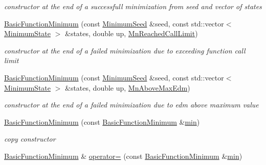 \begin{DoxyCompactItemize}
\begin{DoxyCompactList}\small\item\em constructor at the end of a successfull minimization from seed and vector of states \end{DoxyCompactList}\item 
\mbox{\hyperlink{classROOT_1_1Minuit2_1_1BasicFunctionMinimum_a2a15d2336acfb9f3be41de8e477c191a}{Basic\+Function\+Minimum}} (const \mbox{\hyperlink{classROOT_1_1Minuit2_1_1MinimumSeed}{Minimum\+Seed}} \&seed, const std\+::vector$<$ \mbox{\hyperlink{classROOT_1_1Minuit2_1_1MinimumState}{Minimum\+State}} $>$ \&states, double up, \mbox{\hyperlink{classROOT_1_1Minuit2_1_1BasicFunctionMinimum_1_1MnReachedCallLimit}{Mn\+Reached\+Call\+Limit}})
\begin{DoxyCompactList}\small\item\em constructor at the end of a failed minimization due to exceeding function call limit \end{DoxyCompactList}\item 
\mbox{\hyperlink{classROOT_1_1Minuit2_1_1BasicFunctionMinimum_ae30a460175a2bbf715f3ee0d6092c8b6}{Basic\+Function\+Minimum}} (const \mbox{\hyperlink{classROOT_1_1Minuit2_1_1MinimumSeed}{Minimum\+Seed}} \&seed, const std\+::vector$<$ \mbox{\hyperlink{classROOT_1_1Minuit2_1_1MinimumState}{Minimum\+State}} $>$ \&states, double up, \mbox{\hyperlink{classROOT_1_1Minuit2_1_1BasicFunctionMinimum_1_1MnAboveMaxEdm}{Mn\+Above\+Max\+Edm}})
\begin{DoxyCompactList}\small\item\em constructor at the end of a failed minimization due to edm above maximum value \end{DoxyCompactList}\item 
\mbox{\hyperlink{classROOT_1_1Minuit2_1_1BasicFunctionMinimum_ae0812dcb933989ffd9e096792367d0b7}{Basic\+Function\+Minimum}} (const \mbox{\hyperlink{classROOT_1_1Minuit2_1_1BasicFunctionMinimum}{Basic\+Function\+Minimum}} \&\mbox{\hyperlink{adat__devel_2lib_2SU3_2SU3__internal_8h_ab0f5fed3171eb00d1c5f037d9f518a23}{min}})
\begin{DoxyCompactList}\small\item\em copy constructor \end{DoxyCompactList}\item 
\mbox{\hyperlink{classROOT_1_1Minuit2_1_1BasicFunctionMinimum}{Basic\+Function\+Minimum}} \& \mbox{\hyperlink{classROOT_1_1Minuit2_1_1BasicFunctionMinimum_ad143c1c314e041649151bac9bb9e7a91}{operator=}} (const \mbox{\hyperlink{classROOT_1_1Minuit2_1_1BasicFunctionMinimum}{Basic\+Function\+Minimum}} \&\mbox{\hyperlink{adat__devel_2lib_2SU3_2SU3__internal_8h_ab0f5fed3171eb00d1c5f037d9f518a23}{min}})

\end{DoxyCompactItemize}
